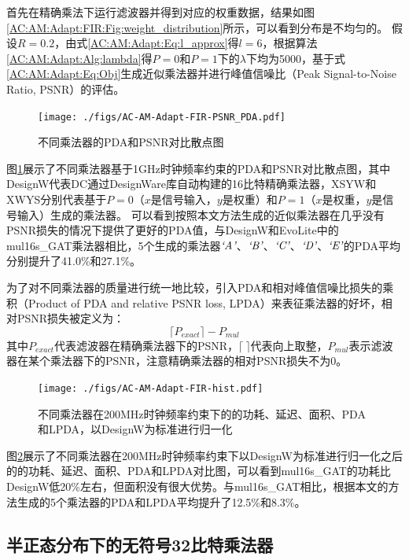 首先在精确乘法下运行滤波器并得到对应的权重数据，结果如图\ref{AC:AM:Adapt:FIR:Fig:weight_distribution}所示，可以看到分布是不均匀的。
假设$R=0.2$，由式\ref{AC:AM:Adapt:Eq:l_approx}得$l=6$，根据算法\ref{AC:AM:Adapt:Alg:lambda}得$P=0$和$P=1$下的$\lambda$下均为5000，基于式\eqref{AC:AM:Adapt:Eq:Obj}生成近似乘法器并进行峰值信噪比（Peak Signal-to-Noise Ratio, PSNR）的评估。

\begin{figure}[!ht]
    \centering
    \texttt{[image: ./figs/AC-AM-Adapt-FIR-PSNR\_PDA.pdf]}
    \caption{不同乘法器的PDA和PSNR对比散点图}
    \label{AC:AM:Adapt:FIR:Fig:PSNR_PDA}
\end{figure}

图\ref{AC:AM:Adapt:FIR:Fig:PSNR_PDA}展示了不同乘法器基于1GHz时钟频率约束的PDA和PSNR对比散点图，其中DesignW代表DC通过DesignWare库\cite{IP:DesignWare}自动构建的16比特精确乘法器，XSYW和XWYS分别代表基于$P=0$（$x$是信号输入，$y$是权重）和$P=1$（$x$是权重，$y$是信号输入）生成的乘法器。
可以看到按照本文方法生成的近似乘法器在几乎没有PSNR损失的情况下提供了更好的PDA值，与DesignW和EvoLite中的mul16s\_GAT乘法器相比，5个生成的乘法器$\emph{`A'}$、$\emph{`B'}$、$\emph{`C'}$、$\emph{`D'}$、$\emph{`E'}$的PDA平均分别提升了41.0\%和27.1\%。

为了对不同乘法器的质量进行统一地比较，引入PDA和相对峰值信噪比损失的乘积（Product of PDA and relative PSNR loss, LPDA）来表征乘法器的好坏，相对PSNR损失被定义为：
\begin{equation}
    \lceil P_{exact} \rceil - P_{mul}
\label{AC:AM:Adapt:FIR:Eq:R_PSNR_Loss}
\end{equation}
其中$P_{exact}$代表滤波器在精确乘法器下的PSNR，$\lceil \ \rceil$代表向上取整，$P_{mul}$表示滤波器在某个乘法器下的PSNR，注意精确乘法器的相对PSNR损失不为0。

\begin{figure}[!ht]
    \centering
    \texttt{[image: ./figs/AC-AM-Adapt-FIR-hist.pdf]}
    \caption{不同乘法器在200MHz时钟频率约束下的的功耗、延迟、面积、PDA和LPDA，以DesignW为标准进行归一化}
    \label{AC:AM:Adapt:FIR:Fig:hist}
\end{figure}

图\ref{AC:AM:Adapt:FIR:Fig:hist}展示了不同乘法器在200MHz时钟频率约束下以DesignW为标准进行归一化之后的的功耗、延迟、面积、PDA和LPDA对比图，可以看到mul16s\_GAT的功耗比DesignW低20\%左右，但面积没有很大优势。与mul16s\_GAT相比，根据本文的方法生成的5个乘法器的PDA和LPDA平均提升了12.5\%和8.3\%。


\subsection{半正态分布下的无符号32比特乘法器}

